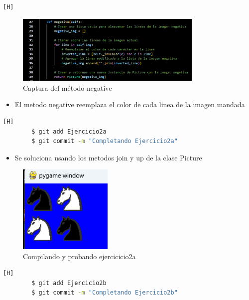 \documentclass{article}
\begin{document}
 	\begin{lstlisting}[language=bash,caption={Agregando metodo negative de la clase Picture}][H]
	\end{lstlisting}
	\begin{figure}[H]
		\centering
		\includegraphics[width=0.8\textwidth,keepaspectratio]{img/negative.png}
		\caption{Captura del método negative}
	\end{figure}
	\begin{itemize}	
		\item El metodo negative reemplaza el color de cada linea de la imagen mandada
	\end{itemize}
        \clearpage
	\begin{lstlisting}[language=bash,caption={Completando Ejercicio2a}][H]
		$ git add Ejercicio2a
		$ git commit -m "Completando Ejercicio2a"			
	\end{lstlisting}
	
	\begin{itemize}	
		\item Se soluciona usando los metodos join y up de la clase Picture
	\end{itemize}
	\begin{figure}[H]
		\centering
		\includegraphics[width=0.4\textwidth,keepaspectratio]{img/2a.png}
		\caption{Compilando y probando ejercicicio2a}
	\end{figure}
	\begin{lstlisting}[language=bash,caption={Completando Ejercicio2b}][H]
		$ git add Ejercicio2b
		$ git commit -m "Completando Ejercicio2b"			
	\end{lstlisting}
\end{document}
